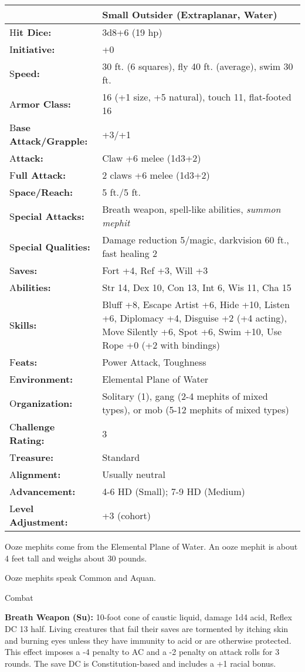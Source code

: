 \documentclass{article}
\begin{document}
\begin{tabular}{|>{\raggedright}p{85pt}|>{\raggedright}p{240pt}|}
\hline
  & Small Outsider (Extraplanar, Water)\tabularnewline
\hline
H\textbf{it Dice:} & 3d8+6 (19 hp)\tabularnewline
\hline
I\textbf{nitiative:} & +0\tabularnewline
\hline
S\textbf{peed:} & 30 ft. (6 squares), fly 40 ft. (average), swim 30 ft.\tabularnewline
\hline
A\textbf{rmor Class:} & 16 (+1 size, +5 natural), touch 11, flat-footed 16\tabularnewline
\hline
B\textbf{ase Attack/Grapple:} & +3/+1\tabularnewline
\hline
A\textbf{ttack:} & Claw +6 melee (1d3+2)\tabularnewline
\hline
F\textbf{ull Attack:} & 2 claws +6 melee (1d3+2)\tabularnewline
\hline
S\textbf{pace/Reach:} & 5 ft./5 ft.\tabularnewline
\hline
S\textbf{pecial Attacks:} & Breath weapon, spell-like abilities, \textit{summon 
mephit}\tabularnewline
\hline
S\textbf{pecial Qualities:} & Damage reduction 5/magic, darkvision 60 ft., fast 
healing 2\tabularnewline
\hline
S\textbf{aves:} & Fort +4, Ref +3, Will +3\tabularnewline
\hline
A\textbf{bilities:} & Str 14, Dex 10, Con 13, Int 6, Wis 11, Cha 15\tabularnewline
\hline
S\textbf{kills:} & Bluff +8, Escape Artist +6, Hide +10, Listen +6, Diplomacy +4, 
Disguise +2 (+4 acting), Move Silently +6, Spot +6, Swim +10, Use Rope +0 (+2 with 
bindings)\tabularnewline
\hline
F\textbf{eats:} & Power Attack, Toughness \tabularnewline
\hline
E\textbf{nvironment:} & Elemental Plane of Water\tabularnewline
\hline
O\textbf{rganization:} & Solitary (1), gang (2-4 mephits of mixed types), or mob 
(5-12 mephits of mixed types)\tabularnewline
\hline
C\textbf{hallenge Rating:} & 3\tabularnewline
\hline
T\textbf{reasure:} & Standard\tabularnewline
\hline
A\textbf{lignment:} & Usually neutral\tabularnewline
\hline
A\textbf{dvancement:} & 4-6 HD (Small); 7-9 HD (Medium)\tabularnewline
\hline
L\textbf{evel Adjustment:} & +3 (cohort)\tabularnewline
\hline
\end{tabular}

Ooze mephits come from the Elemental Plane of Water. An ooze mephit is about 4 
feet tall and weighs about 30 pounds.

Ooze mephits speak Common and Aquan.

Combat

\textbf{Breath Weapon (Su): }10-foot cone of caustic liquid, damage 1d4 acid, Reflex 
DC 13 half. Living creatures that fail their saves are tormented by itching skin 
and burning eyes unless they have immunity to acid or are otherwise protected. 
This effect imposes a -4 penalty to AC and a -2 penalty on attack rolls for 3 rounds. 
The save DC is Constitution-based and includes a +1 racial bonus. 
\end{document}
